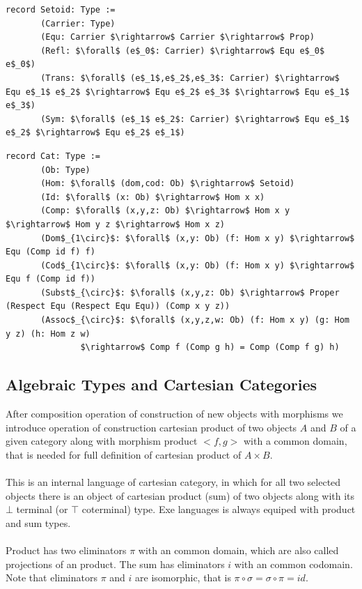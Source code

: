 \documentclass[11pt,oneside]{article}
\begin{document}
\begin{lstlisting}[mathescape=true]
record Setoid: Type :=
       (Carrier: Type)
       (Equ: Carrier $\rightarrow$ Carrier $\rightarrow$ Prop)
       (Refl: $\forall$ (e$_0$: Carrier) $\rightarrow$ Equ e$_0$ e$_0$)
       (Trans: $\forall$ (e$_1$,e$_2$,e$_3$: Carrier) $\rightarrow$ Equ e$_1$ e$_2$ $\rightarrow$ Equ e$_2$ e$_3$ $\rightarrow$ Equ e$_1$ e$_3$)
       (Sym: $\forall$ (e$_1$ e$_2$: Carrier) $\rightarrow$ Equ e$_1$ e$_2$ $\rightarrow$ Equ e$_2$ e$_1$)
\end{lstlisting}

\begin{lstlisting}[mathescape=true]
record Cat: Type := 
       (Ob: Type)
       (Hom: $\forall$ (dom,cod: Ob) $\rightarrow$ Setoid)
       (Id: $\forall$ (x: Ob) $\rightarrow$ Hom x x)
       (Comp: $\forall$ (x,y,z: Ob) $\rightarrow$ Hom x y $\rightarrow$ Hom y z $\rightarrow$ Hom x z)
       (Dom$_{1\circ}$: $\forall$ (x,y: Ob) (f: Hom x y) $\rightarrow$ Equ (Comp id f) f)
       (Cod$_{1\circ}$: $\forall$ (x,y: Ob) (f: Hom x y) $\rightarrow$ Equ f (Comp id f))
       (Subst$_{\circ}$: $\forall$ (x,y,z: Ob) $\rightarrow$ Proper (Respect Equ (Respect Equ Equ)) (Comp x y z))
       (Assoc$_{\circ}$: $\forall$ (x,y,z,w: Ob) (f: Hom x y) (g: Hom y z) (h: Hom z w) 
               $\rightarrow$ Comp f (Comp g h) = Comp (Comp f g) h)
\end{lstlisting}

\newpage
\subsection{Algebraic Types and Cartesian Categories}

After composition operation of construction of new objects with morphisms we introduce
operation of construction cartesian product of two objects $A$ and $B$ of a given
category along with morphism product $<f,g>$ with a common domain, that is needed
for full definition of cartesian product of $A \times B$.

\paragraph{}
This is an internal language of cartesian category, in which for all two selected objects there is an object
of cartesian product (sum) of two objects along with its $\bot$ terminal (or $\top$ coterminal) type.
Exe languages is always equiped with product and sum types.

\paragraph{}
Product has two eliminators $\pi$ with an common domain, which are also called projections of an product.
The sum has eliminators $i$ with an common codomain.
Note that eliminators $\pi$ and $i$ are isomorphic, that is $\pi \circ \sigma = \sigma \circ \pi = id$.
\end{document}
